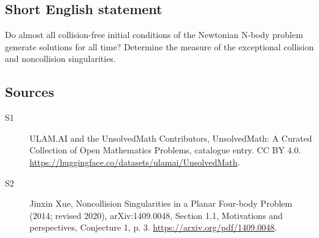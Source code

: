 \documentclass[11pt]{article}
\begin{document}
\subsection{Short English statement}
Do almost all collision-free initial conditions of the Newtonian N-body problem generate solutions for all time? Determine the measure of the exceptional collision and noncollision singularities.
\subsection{Sources}
\begin{description}
\item[\hypertarget{source:statement:1}{S1}] ULAM.AI and the UnsolvedMath Contributors, UnsolvedMath: A Curated Collection of Open Mathematics Problems, catalogue entry. CC BY 4.0. \url{https://huggingface.co/datasets/ulamai/UnsolvedMath}.
\item[\hypertarget{source:statement:2}{S2}] Jinxin Xue, Noncollision Singularities in a Planar Four-body Problem (2014; revised 2020), arXiv:1409.0048, Section 1.1, Motivations and perspectives, Conjecture 1, p. 3. \url{https://arxiv.org/pdf/1409.0048}.
\end{description}
\label{end:statement}
\end{document}

